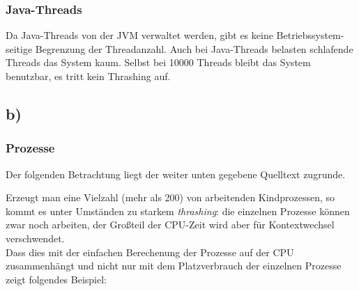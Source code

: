 \documentclass[a4paper,
12pt,
BCOR12mm,
]{scrartcl}
\begin{document}
\subsubsection*{Java-Threads}
Da Java-Threads von der JVM verwaltet werden, gibt es keine Betriebssystem-seitige Begrenzung der Threadanzahl.
Auch bei Java-Threads belasten schlafende Threads das System kaum. Selbst bei 10000 Threads bleibt
das System benutzbar, es tritt kein Thrashing auf.

\subsection*{b)}
\subsubsection*{Prozesse}
Der folgenden Betrachtung liegt der weiter unten gegebene Quelltext zugrunde.

\begin{figure}[h!]
	\begin{center}
	\end{center}
\end{figure}

Erzeugt man eine Vielzahl (mehr als 200) von arbeitenden Kindprozessen, so kommt es unter Umständen zu
starkem \emph{thrashing}: die einzelnen Prozesse können zwar noch arbeiten, der Großteil
der CPU-Zeit wird aber für Kontextwechsel verschwendet.\\
Dass dies mit der einfachen Berechenung der Prozesse auf der CPU zusammenhängt und nicht
nur mit dem Platzverbrauch der einzelnen Prozesse zeigt folgendes Beispiel:
\end{document}
